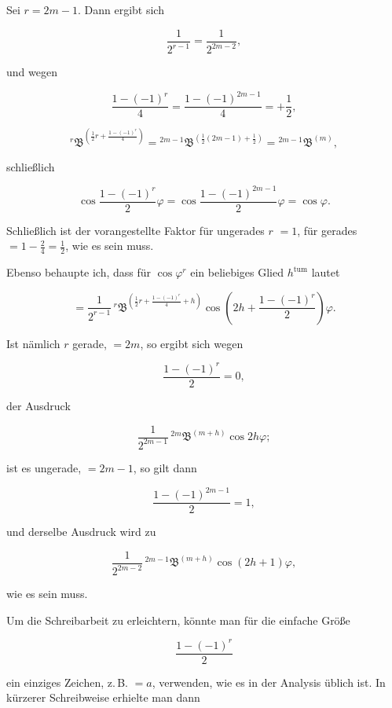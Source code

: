 Sei $r=2m-1$. Dann ergibt sich

\[
\frac{1}{2^{r-1}} = \frac{1}{2^{2m-2}},
\]

\noindent und wegen

\[
\frac{1-(-1)^r}{4} = \frac{1-(-1)^{2m-1}}{4} = +\frac{1}{2},
\]

\[
{}^{r}\mathfrak{B}^{\left(\frac{1}{2}r+\frac{1-(-1)^r}{4}\right)} = {}^{2m-1}\mathfrak{B}^{\left(\frac{1}{2}(2m-1)+\frac{1}{2}\right)} = {}^{2m-1}\mathfrak{B}^{(m)},
\]

\noindent schließlich

\[
\cos\frac{1-(-1)^r}{2}\varphi = \cos\frac{1-(-1)^{2m-1}}{2}\varphi = \cos\varphi.
\]

Schließlich ist der vorangestellte Faktor für ungerades $r$ $=1$,
für gerades $=1-\tfrac{2}{4}=\tfrac{1}{2}$, wie es sein muss.

Ebenso behaupte ich, dass für $\cos\varphi^r$ ein beliebiges Glied $h^{\text{tum}}$ lautet

\[
= \frac{1}{2^{r-1}}\,{}^{r}\mathfrak{B}^{\left(\frac{1}{2}r+\frac{1-(-1)^r}{4}+h\right)}\cos\left(2h+\frac{1-(-1)^r}{2}\right)\varphi.
\]

Ist nämlich $r$ gerade, $=2m$, so ergibt sich wegen

\[
\frac{1-(-1)^r}{2} = 0,
\]

\noindent der Ausdruck

\[
\frac{1}{2^{2m-1}}\,{}^{2m}\mathfrak{B}^{(m+h)}\cos2h\varphi;
\]

\noindent ist es ungerade, $=2m-1$, so gilt dann

\[
\frac{1-(-1)^{2m-1}}{2} = 1,
\]

\noindent und derselbe Ausdruck wird zu

\[
\frac{1}{2^{2m-2}}\,{}^{2m-1}\mathfrak{B}^{(m+h)}\cos(2h+1)\varphi,
\]

\noindent wie es sein muss.

Um die Schreibarbeit zu erleichtern, könnte man für die einfache Größe

\[
\frac{1-(-1)^r}{2}
\]

\noindent ein einziges Zeichen, z.\,B. $=a$, verwenden, wie es in der Analysis üblich
ist. In kürzerer Schreibweise erhielte man dann
